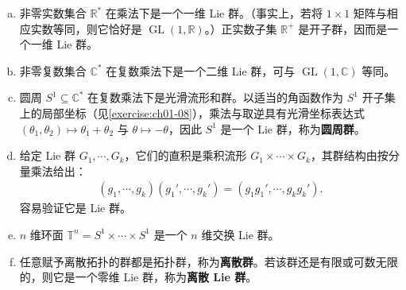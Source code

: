 \documentclass[../../main.tex]{subfiles}
\begin{document}
\begin{example}
\begin{enumerate}[(a)]
\item 非零实数集合 $\mathbb{R}^*$ 在乘法下是一个一维 Lie 群。（事实上，若将 $1\times 1$ 矩阵与相应实数等同，则它恰好是 $\operatorname{GL}(1,\mathbb{R})$。）正实数子集 $\mathbb{R}^+$ 是开子群，因而是一个一维 Lie 群。

\item 非零复数集合 $\mathbb{C}^*$ 在复数乘法下是一个二维 Lie 群，可与 $\operatorname{GL}(1,\mathbb{C})$ 等同。

\item 圆周 $S^1\subseteq\mathbb{C}^*$ 在复数乘法下是光滑流形和群。以适当的角函数作为 $S^1$ 开子集上的局部坐标（见\cref{exercise:ch01-08}），乘法与取逆具有光滑坐标表达式 $(\theta_1,\theta_2)\mapsto\theta_1+\theta_2$ 与 $\theta\mapsto-\theta$，因此 $S^1$ 是一个 Lie 群，称为\textbf{圆周群}。

\item 给定 Lie 群 $G_1,\cdots ,G_k$，它们的直积是乘积流形 $G_1\times\cdots\times G_k$，其群结构由按分量乘法给出：
\begin{align*}
(g_1,\cdots ,g_k)(g_1',\cdots ,g_k')=(g_1g_1',\cdots ,g_kg_k').
\end{align*}
容易验证它是 Lie 群。

\item $n$ 维环面 $\mathbb{T}^n=S^1\times\cdots\times S^1$ 是一个 $n$ 维交换 Lie 群。

\item 任意赋予离散拓扑的群都是拓扑群，称为\textbf{离散群}。若该群还是有限或可数无限的，则它是一个零维 Lie 群，称为\textbf{离散 Lie 群}。
\end{enumerate}
\end{example}
\end{document}
